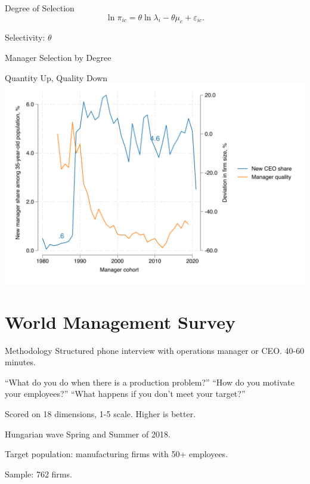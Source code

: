 \documentclass[
  ignorenonframetext,
  aspectratio=1610,
]{beamer}
\begin{document}
\begin{frame}{Degree of Selection}
\protect\hypertarget{degree-of-selection}{}
\[
\ln \pi_{ic} = \theta\ln\lambda_i  - \theta \mu_c + \varepsilon_{ic}.
\]

Selectivity: \(\theta\)
\end{frame}

\begin{frame}{Manager Selection by Degree}
\protect\hypertarget{manager-selection-by-degree}{}

\end{frame}

\begin{frame}{Quantity Up, Quality Down}
\protect\hypertarget{quantity-up-quality-down}{}
\includegraphics{fig/ceo-flow-with-FE.png}
\end{frame}

\section{World Management Survey}\label{world-management-survey}

\begin{frame}{Methodology}
\protect\hypertarget{methodology}{}
Structured phone interview with operations manager or CEO. 40-60
minutes.

``What do you do when there is a production problem?'' ``How do you
motivate your employees?'' ``What happens if you don't meet your
target?''

Scored on 18 dimensions, 1-5 scale. Higher is better.
\end{frame}

\begin{frame}{Hungarian wave}
\protect\hypertarget{hungarian-wave}{}
Spring and Summer of 2018.

Target population: manufacturing firms with 50+ employees.

Sample: 762 firms.
\end{frame}
\end{document}
